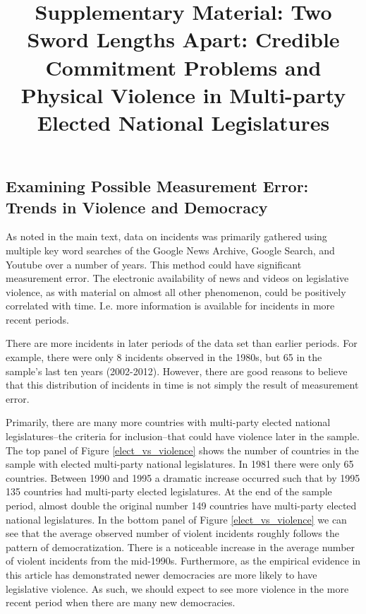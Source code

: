\documentclass[a4paper]{article}\usepackage[]{graphicx}\usepackage[]{color}
\title{Supplementary Material: Two Sword Lengths Apart: Credible Commitment Problems and Physical Violence in Multi-party Elected National Legislatures}
\begin{document}
\maketitle






\subsection*{Examining Possible Measurement Error: Trends in Violence and Democracy}


As noted in the main text, data on incidents was primarily gathered using multiple key word searches of the Google News Archive, Google Search, and Youtube over a number of years. This method could have significant measurement error. The electronic availability of news and videos on legislative violence, as with material on almost all other phenomenon, could be positively correlated with time. I.e. more information is available for incidents in more recent periods.

There are more incidents in later periods of the data set than earlier periods. For example, there were only 8 incidents observed in the 1980s, but 65 in the sample's last ten years (2002-2012). However, there are good reasons to believe that this distribution of incidents in time is not simply the result of measurement error.

Primarily, there are many more countries with multi-party elected national legislatures--the criteria for inclusion--that could have violence later in the sample. The top panel of Figure \ref{elect_vs_violence} shows the number of countries in the sample with elected multi-party national legislatures. In 1981 there were only 65 countries. Between 1990 and 1995 a dramatic increase occurred such that by 1995 135 countries had multi-party elected legislatures. At the end of the sample period, almost double the original number 149 countries have multi-party elected national legislatures. In the bottom panel of Figure \ref{elect_vs_violence} we can see that the average observed number of violent incidents roughly follows the pattern of democratization. There is a noticeable increase in the average number of violent incidents from the mid-1990s. Furthermore, as the empirical evidence in this article has demonstrated newer democracies are more likely to have legislative violence. As such, we should expect to see more violence in the more recent period when there are many new democracies.
\end{document}
